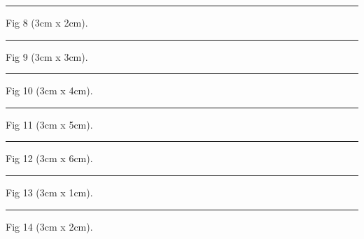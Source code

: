 \documentclass[a4paper,11pt]{article}
\begin{document}
\begin{swarmwrap}%
  \begin{minipage}[t]{3cm}
    \centering
    \rule{\linewidth}{2cm}
    {\footnotesize Fig 8 (3cm x 2cm).}
  \end{minipage}%
\end{swarmwrap}%
\swarmwrapnext
\lipsum[8]%

\begin{swarmwrap}%
  \begin{minipage}[t]{3cm}
    \centering
    \rule{\linewidth}{3cm}
    {\footnotesize Fig 9 (3cm x 3cm).}
  \end{minipage}%
\end{swarmwrap}%
\swarmwrapnext
\lipsum[9]%

\begin{swarmwrap}%
  \begin{minipage}[t]{3cm}
    \centering
    \rule{\linewidth}{4cm}
    {\footnotesize Fig 10 (3cm x 4cm).}
  \end{minipage}%
\end{swarmwrap}%
\swarmwrapnext
\lipsum[10]%

\begin{swarmwrap}%
  \begin{minipage}[t]{3cm}
    \centering
    \rule{\linewidth}{5cm}
    {\footnotesize Fig 11 (3cm x 5cm).}
  \end{minipage}%
\end{swarmwrap}%
\swarmwrapnext
\lipsum[11]%

\begin{swarmwrap}%
  \begin{minipage}[t]{3cm}
    \centering
    \rule{\linewidth}{6cm}
    {\footnotesize Fig 12 (3cm x 6cm).}
  \end{minipage}%
\end{swarmwrap}%
\swarmwrapnext
\lipsum[12]%

\begin{swarmwrap}%
  \begin{minipage}[t]{3cm}
    \centering
    \rule{\linewidth}{1cm}
    {\footnotesize Fig 13 (3cm x 1cm).}
  \end{minipage}%
\end{swarmwrap}%
\swarmwrapnext
\lipsum[13]%

\begin{swarmwrap}%
  \begin{minipage}[t]{3cm}
    \centering
    \rule{\linewidth}{2cm}
    {\footnotesize Fig 14 (3cm x 2cm).}
  \end{minipage}%
\end{swarmwrap}%
\swarmwrapnext
\lipsum[14]%
\end{document}
